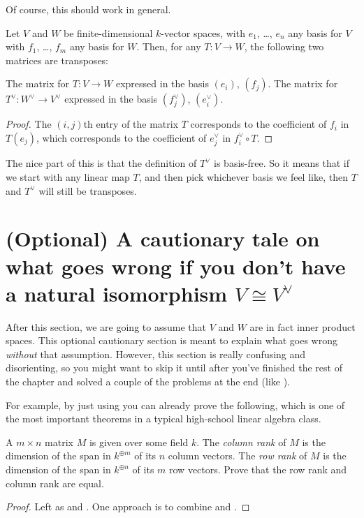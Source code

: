 Of course, this should work in general.
\begin{theorem}
	\label{thm:transpose_dual}
	Let $V$ and $W$ be finite-dimensional $k$-vector spaces,
	with $e_1$, \dots, $e_n$ any basis for $V$
	with $f_1$, \dots, $f_m$ any basis for $W$.
	Then, for any $T \colon V \to W$, the following two matrices are transposes:
	\begin{itemize}
		\ii The matrix for $T \colon V \to W$
		expressed in the basis $(e_i)$, $(f_j)$.
		\ii The matrix for $T^\vee \colon W^\vee \to V^\vee$
		expressed in the basis $(f_j^\vee)$, $(e_i^\vee)$.
	\end{itemize}
\end{theorem}
\begin{proof}
	The $(i,j)$th entry of the matrix $T$
	corresponds to the coefficient of $f_i$ in $T(e_j)$,
	which corresponds to the coefficient of $e_j^\vee$
	in $f_i^\vee \circ T$.
\end{proof}
The nice part of this is that the definition of $T^\vee$ is basis-free.
So it means that if we start with any linear map $T$,
and then pick whichever basis we feel like,
then $T$ and $T^\vee$ will still be transposes.

\section{(Optional) A cautionary tale on what goes wrong if you don't have a natural isomorphism $V \cong V^\vee$}
After this section, we are going to assume that $V$ and $W$ are in fact inner product spaces.
This optional cautionary section is meant to explain what goes wrong \emph{without} that assumption.
However, this section is really confusing and disorienting,
so you might want to skip it until after you've finished the rest of the chapter
and solved a couple of the problems at the end (like ).

For example, by just using  you can already prove the following,
which is one of the most important theorems in a typical high-school linear algebra class.
\begin{theorem}
	[Row rank = column rank]
	A $m \times n$ matrix $M$ is given over some field $k$.
	The \emph{column rank} of $M$ is the dimension of the span in $k^{\oplus m}$
	of its $n$ column vectors.
	The \emph{row rank} of $M$ is the dimension of the span in $k^{\oplus n}$
	of its $m$ row vectors.
	Prove that the row rank and column rank are equal.
\end{theorem}
\begin{proof}
	Left as  and .
	One approach is to combine  and .
\end{proof}


